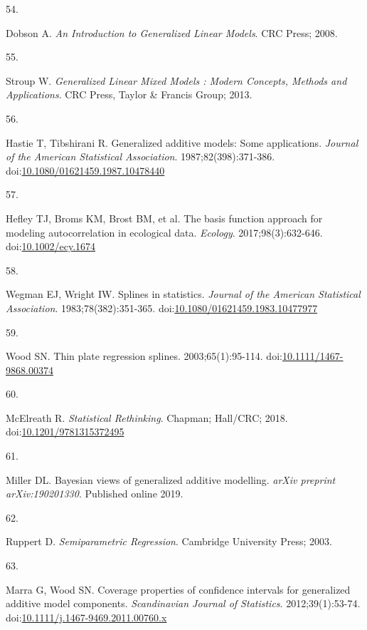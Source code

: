 \documentclass[
]{article}
\newlength{\cslhangindent}
\newlength{\csllabelwidth}
\newlength{\cslentryspacingunit} %
\newenvironment{CSLReferences}[2] %
 {%
  \setlength{\parindent}{0pt}
  \ifodd #1
  \let\oldpar\par
  \def\par{\hangindent=\cslhangindent\oldpar}
  \fi
  \setlength{\parskip}{#2\cslentryspacingunit}
 }%
 {}
\newcommand{\CSLLeftMargin}[1]{\parbox[t]{\csllabelwidth}{#1}}
\newcommand{\CSLRightInline}[1]{\parbox[t]{\linewidth - \csllabelwidth}{#1}\break}
\begin{document}
\begin{CSLReferences}{0}{0}
\leavevmode{}%
\CSLLeftMargin{54. }
\CSLRightInline{Dobson A. \emph{An Introduction to Generalized Linear Models}. CRC Press; 2008.}

\leavevmode{}%
\CSLLeftMargin{55. }
\CSLRightInline{Stroup W. \emph{Generalized Linear Mixed Models : Modern Concepts, Methods and Applications}. CRC Press, Taylor \& Francis Group; 2013.}

\leavevmode{}%
\CSLLeftMargin{56. }
\CSLRightInline{Hastie T, Tibshirani R. Generalized additive models: Some applications. \emph{Journal of the American Statistical Association}. 1987;82(398):371-386. doi:\href{https://doi.org/10.1080/01621459.1987.10478440}{10.1080/01621459.1987.10478440}}

\leavevmode{}%
\CSLLeftMargin{57. }
\CSLRightInline{Hefley TJ, Broms KM, Brost BM, et al. The basis function approach for modeling autocorrelation in ecological data. \emph{Ecology}. 2017;98(3):632-646. doi:\href{https://doi.org/10.1002/ecy.1674}{10.1002/ecy.1674}}

\leavevmode{}%
\CSLLeftMargin{58. }
\CSLRightInline{Wegman EJ, Wright IW. Splines in statistics. \emph{Journal of the American Statistical Association}. 1983;78(382):351-365. doi:\href{https://doi.org/10.1080/01621459.1983.10477977}{10.1080/01621459.1983.10477977}}

\leavevmode{}%
\CSLLeftMargin{59. }
\CSLRightInline{Wood SN. Thin plate regression splines. 2003;65(1):95-114. doi:\href{https://doi.org/10.1111/1467-9868.00374}{10.1111/1467-9868.00374}}

\leavevmode{}%
\CSLLeftMargin{60. }
\CSLRightInline{McElreath R. \emph{Statistical Rethinking}. Chapman; Hall/{CRC}; 2018. doi:\href{https://doi.org/10.1201/9781315372495}{10.1201/9781315372495}}

\leavevmode{}%
\CSLLeftMargin{61. }
\CSLRightInline{Miller DL. Bayesian views of generalized additive modelling. \emph{arXiv preprint arXiv:190201330}. Published online 2019.}

\leavevmode{}%
\CSLLeftMargin{62. }
\CSLRightInline{Ruppert D. \emph{Semiparametric Regression}. Cambridge University Press; 2003.}

\leavevmode{}%
\CSLLeftMargin{63. }
\CSLRightInline{Marra G, Wood SN. Coverage properties of confidence intervals for generalized additive model components. \emph{Scandinavian Journal of Statistics}. 2012;39(1):53-74. doi:\href{https://doi.org/10.1111/j.1467-9469.2011.00760.x}{10.1111/j.1467-9469.2011.00760.x}}


\end{CSLReferences}
\end{document}

